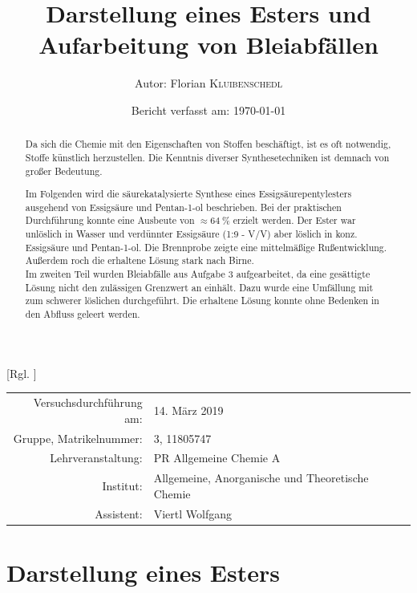 \documentclass{article}
\title{Darstellung eines Esters und Aufarbeitung von Bleiabfällen \cite{Versuchsvorschrift}} %
\author{Autor: Florian \textsc{Kluibenschedl}} %
\date{Bericht verfasst am: \today} %
\begin{document}
  [Rgl. ]{}{}
  
  \maketitle %
  
  \begin{center}
    \begin{tabular}{r p{4cm}}
      Versuchsdurchführung am: & 14. März 2019\\ %
      Gruppe, Matrikelnummer: & 3, 11805747 \\
      Lehrveranstaltung: & PR Allgemeine Chemie A \\
      Institut: & Allgemeine, Anorganische und Theoretische Chemie \\
      Assistent: & Viertl Wolfgang %
    \end{tabular}
  \end{center}


  \begin{abstract}
    Da sich die Chemie mit den Eigenschaften von Stoffen beschäftigt, ist es oft notwendig, Stoffe künstlich herzustellen. Die Kenntnis diverser Synthesetechniken ist demnach von großer Bedeutung. 
    
    Im Folgenden wird die säurekatalysierte Synthese eines Essigsäurepentylesters ausgehend von Essigsäure und Pentan-1-ol beschrieben. Bei der praktischen Durchführung konnte eine Ausbeute von $\approx \SI[mode=text]{64}{\percent}$ erzielt werden. Der Ester war unlöslich in Wasser und verdünnter Essigsäure (1:9 - V/V) aber löslich in konz. Essigsäure und Pentan-1-ol. Die Brennprobe zeigte eine mittelmäßige Rußentwicklung. Außerdem roch die erhaltene Lösung stark nach Birne.\\
    
    Im zweiten Teil wurden Bleiabfälle aus Aufgabe 3 aufgearbeitet, da eine gesättigte  Lösung nicht den zulässigen Grenzwert an  einhält. Dazu wurde eine Umfällung mit  zum schwerer löslichen  durchgeführt. Die erhaltene Lösung konnte ohne Bedenken in den Abfluss geleert werden. 
    
  \end{abstract}
  
  \pagebreak 
  
  \section{Darstellung eines Esters}
  
\end{document}
